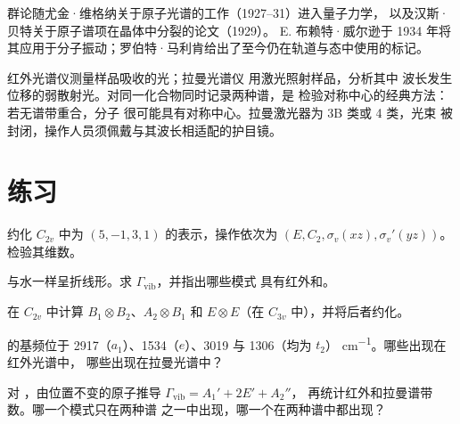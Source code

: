 \begin{history}
群论随尤金·维格纳关于原子光谱的工作（1927--31）进入量子力学，
以及汉斯·贝特关于原子谱项在晶体中分裂的论文（1929）。
E. 布赖特·威尔逊于
1934 年将其应用于分子振动；罗伯特·马利肯给出了至今仍在轨道与态中使用的标记。
\end{history}

\begin{inthelab}[红外与拉曼并排比较]
红外光谱仪测量样品吸收的光；拉曼光谱仪
用激光照射样品，分析其中
波长发生位移的弱散射光。对同一化合物同时记录两种谱，是
检验对称中心的经典方法：若无谱带重合，分子
很可能具有对称中心。拉曼激光器为 3B 类或 4 类，光束
被封闭，操作人员须佩戴与其波长相适配的护目镜。
\end{inthelab}

\section{练习}

\begin{exercise}[$\star$]\label{exo:b3:group-theory-applied:1}
约化 $C_{2v}$ 中为 $(5, -1, 3, 1)$ 的表示，操作依次为 $(E, C_2,
\sigma_v(xz), \sigma_v'(yz))$。检验其维数。
\end{exercise}

\begin{exercise}[$\star$]\label{exo:b3:group-theory-applied:2}
 与水一样呈折线形。求 $\Gamma_{\mathrm{vib}}$，并指出哪些模式
具有红外和。
\end{exercise}

\begin{exercise}[$\star$]\label{exo:b3:group-theory-applied:3}
在 $C_{2v}$ 中计算 $B_1\otimes B_2$、$A_2\otimes B_1$ 和
$E\otimes E$（在 $C_{3v}$ 中），并将后者约化。
\end{exercise}

\begin{exercise}[$\star$]\label{exo:b3:group-theory-applied:4}
 的基频位于 2917（$a_1$）、1534（$e$）、3019 与 1306（均为 $t_2$）
\unit{cm^{-1}}。哪些出现在红外光谱中，
哪些出现在拉曼光谱中？
\end{exercise}

\begin{exercise}[$\star\star$]\label{exo:b3:group-theory-applied:5}
对 ，由位置不变的原子推导 $\Gamma_{\mathrm{vib}} = A_1' + 2E' + A_2''$，
再统计红外和拉曼谱带数。哪一个模式只在两种谱
之一中出现，哪一个在两种谱中都出现？
\end{exercise}

